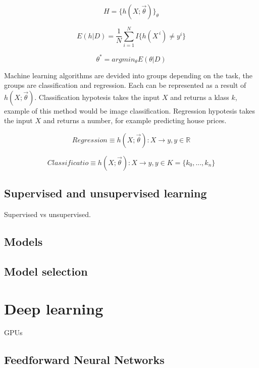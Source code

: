 \documentclass[times, utf8, diplomski]{fer}
\begin{document}
\begin{equation} \label{eq:model}
	H = \{ h(X ; \vec{\theta}) \}_{\theta}
\end{equation}

\begin{equation} \label{eq:error_function}
	E(h|D) =  \frac{1}{N} \displaystyle\sum_{i=1}^{N} I\{h(X^{\,i}) \neq y^{i}\}
\end{equation}

\begin{equation} \label{eq:optimization_function}
	\theta^{*} = argmin_{\theta} E(\theta | D)
\end{equation}


Machine learning algorithms are devided into groups depending on the task, the groups are classification and regression. Each can be represented as a result of $h(X ; \vec{\theta})$. Classification hypotesis takes the input $X$ and returns a klass $k$, example of this method would be image classification. Regression hypotesis takes the input $X$ and returns a number, for example predicting house prices.

\begin{equation} \label{eq:accuracy}
	Regression \equiv h(X ; \vec{\theta}) : X \to y, y \in \mathbb{R}
\end{equation}

\begin{equation} \label{eq:precision}
	Classificatio  \equiv h(X ; \vec{\theta}) : X \to y, y \in K = \{k_{0}, ..., k_{n}\}
\end{equation}


\subsection{Supervised and unsupervised learning}
Supervised vs unsupervised.

\subsection{Models}
\subsection{Model selection}

\section{Deep learning}
GPUs

\subsection{Feedforward Neural Networks}
\end{document}
